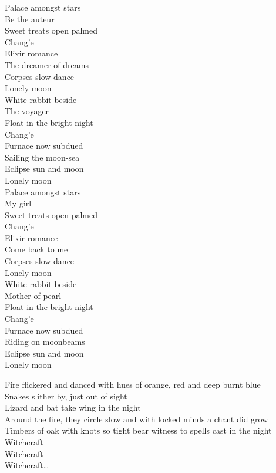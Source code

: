 Palace amongst stars\\
Be the auteur\\
Sweet treats open palmed\\
Chang'e\\
Elixir romance\\
The dreamer of dreams\\
Corpses slow dance\\
Lonely moon\\
White rabbit beside\\
The voyager\\
Float in the bright night\\
Chang'e\\
Furnace now subdued\\
Sailing the moon-sea\\
Eclipse sun and moon\\
Lonely moon\\
Palace amongst stars\\
My girl\\
Sweet treats open palmed\\
Chang'e\\
Elixir romance\\
Come back to me\\
Corpses slow dance\\
Lonely moon\\
White rabbit beside\\
Mother of pearl\\
Float in the bright night\\
Chang'e\\
Furnace now subdued\\
Riding on moonbeams\\
Eclipse sun and moon\\
Lonely moon\\


Fire flickered and danced with hues of orange, red and deep burnt blue\\
Snakes slither by, just out of sight\\
Lizard and bat take wing in the night\\
Around the fire, they circle slow and with locked minds a chant did grow\\
Timbers of oak with knots so tight bear witness to spells cast in the night\\

Witchcraft\\
Witchcraft\\
Witchcraft…\\

